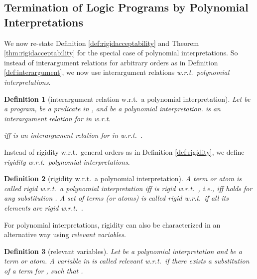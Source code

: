 \documentclass[envcountsame]{tlp}
\newcounter{ex:der-lastsymconsctr}
\newtheorem{definition}{Definition}
\begin{document}
\subsection{Termination of Logic Programs by Polynomial Interpretations}
\label{Termination poly_interpretation}















We now re-state Definition \ref{def:rigidacceptability} and Theorem
\ref{thm:rigidacceptability} for the special case of 
polynomial interpretations.
So instead of interargument relations for arbitrary orders as in Definition
\ref{def:interargument}, 
we now use
interargument relations \emph{w.r.t.\ polynomial interpretations}.

\begin{definition}[interargument relation w.r.t.\ a polynomial interpretation]
\label{def:polynomialinterargumentrelation}
Let  be a program,  be a
predicate in , and  be a polynomial interpretation. 
 is an \emph{interargument relation}  for  in  w.r.t.\

iff  is an interargument relation  for  in  w.r.t.\
.
\end{definition}



Instead of rigidity w.r.t.\ general orders as in Definition
\ref{def:rigidity}, we define \emph{rigidity w.r.t.\ polynomial interpretations}.



\begin{definition}[rigidity w.r.t.\ a polynomial interpretation]
\label{def:rigidity-preinterpretation}
A term or atom  is called
\emph{rigid w.r.t.\ a polynomial interpretation}
 iff
 is rigid w.r.t.\ , i.e., 
iff 
 holds for any
substitution . A set of terms (or atoms)  is called \emph{rigid}
w.r.t.\  if all its elements are rigid w.r.t.\ .
\end{definition}



For polynomial interpretations, rigidity can also be characterized in an
alternative way using \emph{relevant variables}.



\begin{definition}[relevant variables]\label{def:relevantvar}
Let  be a polynomial interpretation and  be a term or
atom. A variable  in
 is called \emph{relevant} w.r.t.\  if there exists a substitution
 of a term  for ,
such that
. 
\end{definition}
\end{document}
